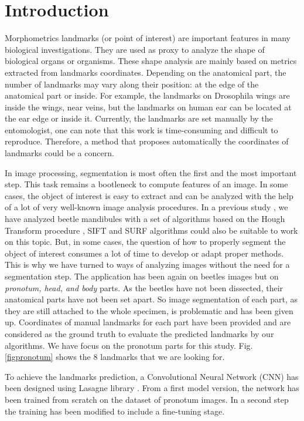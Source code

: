 \documentclass[10pt]{article}
\begin{document}
\section{Introduction}
Morphometrics landmarks (or point of interest) are important features
in many biological investigations. They are used as proxy to analyze
the shape of biological organs or organisms. These shape analysis are mainly
based on metrics extracted from landmarks coordinates. Depending on the anatomical part, the number of landmarks may vary along their position: at the edge of the anatomical part or inside. For example, the landmarks on Drosophila wings \cite{drosophilaWings} are inside the wings, near veins, but the landmarks on human ear \cite{cintas2016automatic} can be located at
the ear edge or inside it. Currently, the landmarks are set manually by
the entomologist, one can note that this work is time-consuming and difficult to
reproduce. Therefore, a method that proposes automatically the
coordinates of landmarks could be a concern.

In image processing, segmentation is most often the first and the most
important step. This task remains a bootleneck to compute features of
an image. In some cases, the object of interest is easy to extract and
can be analyzed with the help of a lot of very well-known image
analysis procedures. In a previous study \cite{le2017maelab}, we have analyzed beetle
mandibules with a set of algorithms based on the Hough Transform
procedure \cite{palaniswamy2010automatic}, SIFT
\cite{lowe2004distinctive} and SURF \cite{bay2006surf} algorithms could also be
suitable to work on this topic. But, in some cases, the question of how to properly segment the
object of interest consumes a lot of time to develop or adapt proper methods. This is why
we have turned to ways of analyzing images without the need for a segmentation step. The application has been again on beetles images
but on \textit{pronotum, head, and body} parts. As the beetles have not been dissected, their anatomical parts have not been set apart. So image segmentation of each part, as they are still attached to the whole specimen, is problematic and has been given up. Coordinates of manual landmarks for each part
have been provided and are considered as the ground
truth to evaluate the predicted landmarks by our algorithms. We have focus on the
pronotum parts for this study. Fig.\ref{figpronotum} shows
the $8$ landmarks that we are looking for.


To achieve the landmarks prediction, a Convolutional Neural Network
(CNN) \cite{lecun2010convolutional} has been designed using Lasagne
library \cite{lasagne}. From a first model version, the network has been
trained from scratch on the dataset of pronotum images. In a second
step the training has been modified to include a fine-tuning
\cite{yosinski2014transferable} stage.
\end{document}
